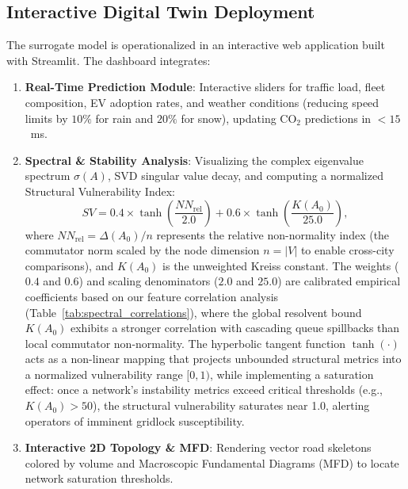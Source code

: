 \documentclass[lettersize,journal]{IEEEtran}
\begin{document}
\subsection{Interactive Digital Twin Deployment}
The surrogate model is operationalized in an interactive web application built with Streamlit. The dashboard integrates:
\begin{enumerate}
    \item \textbf{Real-Time Prediction Module}: Interactive sliders for traffic load, fleet composition, EV adoption rates, and weather conditions (reducing speed limits by $10\%$ for rain and $20\%$ for snow), updating $\text{CO}_2$ predictions in $<15$~ms.
    \item \textbf{Spectral \& Stability Analysis}: Visualizing the complex eigenvalue spectrum $\sigma(A)$, SVD singular value decay, and computing a normalized Structural Vulnerability Index:
    \begin{equation}
    SV = 0.4 \times \tanh\left( \frac{NN_{\text{rel}}}{2.0} \right) + 0.6 \times \tanh\left( \frac{K(A_0)}{25.0} \right),
\end{equation}
where $NN_{\text{rel}} = \Delta(A_0)/n$ represents the relative non-normality index (the commutator norm scaled by the node dimension $n = |V|$ to enable cross-city comparisons), and $K(A_0)$ is the unweighted Kreiss constant. The weights ($0.4$ and $0.6$) and scaling denominators ($2.0$ and $25.0$) are calibrated empirical coefficients based on our feature correlation analysis (Table~\ref{tab:spectral_correlations}), where the global resolvent bound $K(A_0)$ exhibits a stronger correlation with cascading queue spillbacks than local commutator non-normality. The hyperbolic tangent function $\tanh(\cdot)$ acts as a non-linear mapping that projects unbounded structural metrics into a normalized vulnerability range $[0, 1)$, while implementing a saturation effect: once a network's instability metrics exceed critical thresholds (e.g., $K(A_0) > 50$), the structural vulnerability saturates near 1.0, alerting operators of imminent gridlock susceptibility.
    \item \textbf{Interactive 2D Topology \& MFD}: Rendering vector road skeletons colored by volume and Macroscopic Fundamental Diagrams (MFD) to locate network saturation thresholds.
\end{enumerate}
\end{document}
